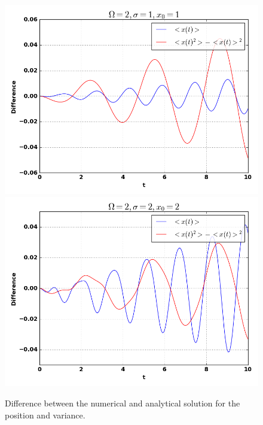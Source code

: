 \documentclass[12pt,a4paper]{article}
\begin{document}
\begin{figure}
\includegraphics[scale=0.4]{Bilder/211_dif.png}
\includegraphics[scale=0.4]{Bilder/222_dif.png}
\caption{Difference between the numerical and analytical solution for the position and variance.}
\label{fig:dif}
\end{figure}
\end{document}
